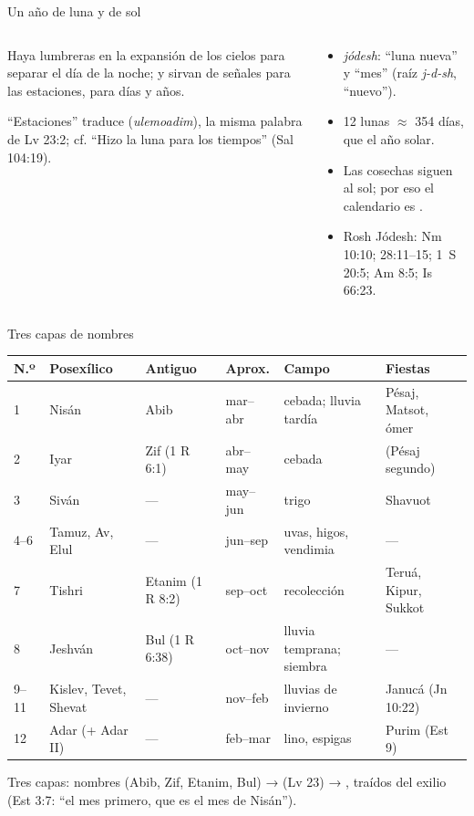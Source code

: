 \begin{frame}{Un año de luna y de sol}
\begin{columns}[c,onlytextwidth]
\begin{column}{0.52\textwidth}
\begin{cita}Haya lumbreras en la expansión de los cielos para separar el día de la noche; y sirvan de señales para las estaciones, para días y años.\end{cita}
\scriptsize ``Estaciones'' traduce  (\emph{ulemoadim}), la misma palabra de Lv 23:2; cf. ``Hizo la luna para los tiempos'' (Sal 104:19).
\end{column}
\begin{column}{0.46\textwidth}\small
\begin{itemize}
\item {} \emph{jódesh}: ``luna nueva'' y ``mes'' (raíz \emph{j-d-sh}, ``nuevo'').
\item 12 lunas $\approx$ 354 días,  que el año solar.
\item Las cosechas siguen al sol; por eso el calendario es .
\item Rosh Jódesh: Nm 10:10; 28:11--15; 1~S 20:5; Am 8:5; Is 66:23.
\end{itemize}
\end{column}
\end{columns}
\end{frame}

\begin{frame}{Tres capas de nombres}
\scriptsize\renewcommand{\arraystretch}{1.05}
\begin{tabular}{@{}L{0.5cm}L{1.5cm}L{1.6cm}L{1.3cm}L{3.0cm}L{3.3cm}@{}}
\toprule
\textbf{N.º} & \textbf{Posexílico} & \textbf{Antiguo} & \textbf{Aprox.} & \textbf{Campo} & \textbf{Fiestas} \\  & Nisán & Abib & mar--abr & cebada; lluvia tardía & Pésaj, Matsot, ómer \\
2 & Iyar & Zif (1 R 6:1) & abr--may & cebada & (Pésaj segundo) \\
3 & Siván & --- & may--jun & trigo & Shavuot \\
4--6 & Tamuz, Av, Elul & --- & jun--sep & uvas, higos, vendimia & --- \\
7 & Tishri & Etanim (1 R 8:2) & sep--oct & recolección & Teruá, Kipur, Sukkot \\
8 & Jeshván & Bul (1 R 6:38) & oct--nov & lluvia temprana; siembra & --- \\
9--11 & Kislev, Tevet, Shevat & --- & nov--feb & lluvias de invierno & Janucá (Jn 10:22) \\
12 & Adar (+ Adar II) & --- & feb--mar & lino, espigas & Purim (Est 9) \\
\bottomrule
\end{tabular}\par\smallskip
\small Tres capas: nombres  (Abib, Zif, Etanim, Bul) →  (Lv 23) → , traídos del exilio (Est 3:7: ``el mes primero, que es el mes de Nisán'').
\end{frame}


